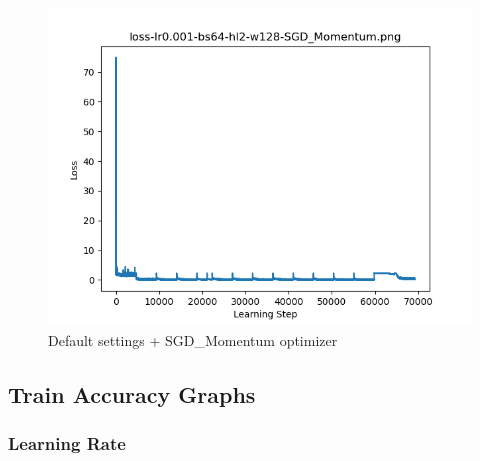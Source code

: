 \documentclass{article}[12pt]
\begin{document}
        \begin{figure}[H]
        \includegraphics[width=\linewidth]{testsResults/loss/optimizer/loss-lr0.001-bs64-hl2-w128-SGD_Momentum.png}
        \caption{Default settings + SGD\_Momentum optimizer}
        \endminipage
    \end{figure}

\subsection{Train Accuracy Graphs}

\subsubsection{Learning Rate}
\end{document}

